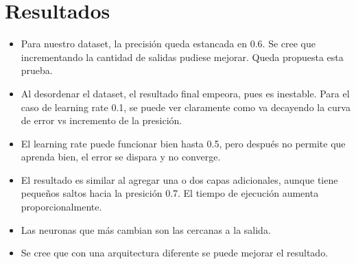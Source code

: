 \documentclass[letterpaper,11pt]{article} %
\begin{document}
\section{Resultados}
\begin{itemize}
\item Para nuestro dataset, la precisión queda estancada en 0.6. Se cree que incrementando la cantidad de salidas pudiese mejorar. Queda propuesta esta prueba.
\item Al desordenar el dataset, el resultado final empeora, pues es inestable. Para el caso de learning rate 0.1, se puede ver claramente como va decayendo la curva de error vs incremento de la presición.
\item El learning rate puede funcionar bien hasta 0.5, pero después no permite que aprenda bien, el error se dispara y no converge.
\item El resultado es similar al agregar una o dos capas adicionales, aunque tiene pequeños saltos hacia la presición 0.7. El tiempo de ejecución aumenta proporcionalmente.
\item Las neuronas que más cambian son las cercanas a la salida.
\item Se cree que con una arquitectura diferente se puede mejorar el resultado.
\end{itemize}
\end{document}
